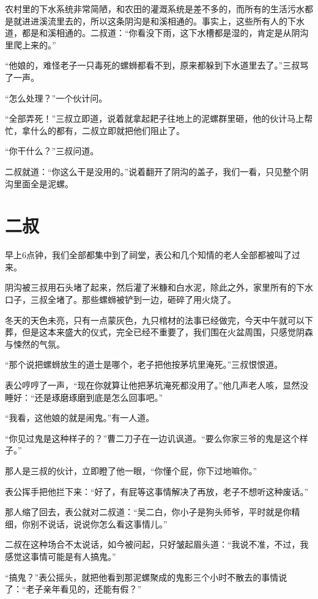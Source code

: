 农村里的下水系统非常简陋，和农田的灌溉系统是差不多的，而所有的生活污水都是就进进溪流里去的，所以这条阴沟是和溪相通的。事实上，这些所有人的下水道，都是和溪相通的。二叔道：“你看没下雨，这下水槽都是湿的，肯定是从阴沟里爬上来的。”

“他娘的，难怪老子一只毒死的螺蛳都看不到，原来都躲到下水道里去了。”三叔骂了一声。

“怎么处理？”一个伙计问。

“全部弄死！”三叔立即道，说着就拿起耙子往地上的泥螺群里砸，他的伙计马上帮忙，拿什么的都有，二叔立即就把他们阻止了。

“你干什么？”三叔问道。

二叔就道：“你这么干是没用的。”说着翻开了阴沟的盖子，我们一看，只见整个阴沟里面全是泥螺。

\chapter{二叔}

早上6点钟，我们全部都集中到了祠堂，表公和几个知情的老人全部都被叫了过来。

阴沟被三叔用石头堵了起来，然后灌了米糠和白水泥，除此之外，家里所有的下水口子，三叔全堵了。那些螺蛳被铲到一边，砸碎了用火烧了。

冬天的天色未亮，只有一点蒙灰色，九只棺材的法事已经做完，今天中午就可以下葬，但是这本来盛大的仪式，完全已经不重要了，我们围在火盆周围，只感觉阴森与悚然的气氛。

“那个说把螺蛳放生的道士是哪个，老子把他按茅坑里淹死。”三叔恨恨道。

表公哼哼了一声，“现在你就算让他把茅坑淹死都没用了。”他几声老人咳，显然没睡好：“还是琢磨琢磨到底是怎么回事吧。”

“我看，这他娘的就是闹鬼。”有一人道。

“你见过鬼是这种样子的？”曹二刀子在一边讥讽道。“要么你家三爷的鬼是这个样子。”

那人是三叔的伙计，立即瞪了他一眼，“你懂个屁，你下过地嘛你。”

表公挥手把他拦下来：“好了，有屁等这事情解决了再放，老子不想听这种废话。”

那人缩了回去，表公就对二叔道：“吴二白，你小子是狗头师爷，平时就是你精细，你别不说话，说说你怎么看这事情儿。”

二叔在这种场合不太说话，如今被问起，只好皱起眉头道：“我说不准，不过，我感觉这事情可能是有人搞鬼。”

“搞鬼？”表公摇头，就把他看到那泥螺聚成的鬼影三个小时不散去的事情说了：“老子亲年看见的，还能有假？”

